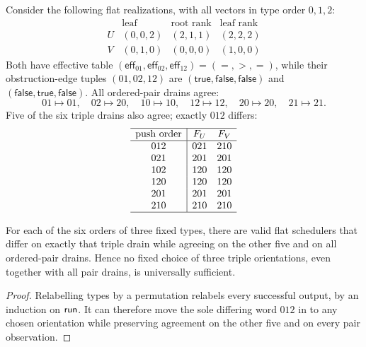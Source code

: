 \begin{example}
\label{ex:missing-orientation}
Consider the following flat realizations, with all vectors in type order
\(0,1,2\):
\begin{equation}
\begin{array}{c|ccc}
 & \text{leaf} & \text{root rank} & \text{leaf rank}\\
\hline
 U&(0,0,2)&(2,1,1)&(2,2,2)\\
 V&(0,1,0)&(0,0,0)&(1,0,0)
\end{array}
\label{eq:missing-orientation-pair}
\end{equation}
Both have effective table
\((\mathsf{eff}_{01},\mathsf{eff}_{02},\mathsf{eff}_{12})=(=,>,=)\), while
their obstruction-edge tuples \((01,02,12)\) are
\((\mathsf{true},\mathsf{false},\mathsf{false})\) and
\((\mathsf{false},\mathsf{true},\mathsf{false})\).  All ordered-pair drains
agree:
\begin{equation}
  01\mapsto01,\quad 02\mapsto20,\quad 10\mapsto10,\quad
  12\mapsto12,\quad 20\mapsto20,\quad 21\mapsto21.
  \label{eq:missing-orientation-pairs}
\end{equation}
Five of the six triple drains also agree; exactly \(012\) differs:
\begin{equation}
\begin{array}{c|cc}
\hline
\text{push order}&F_U&F_V\\
\hline
012&021&210\\
021&201&201\\
102&120&120\\
120&120&120\\
201&201&201\\
210&210&210\\
\hline
\end{array}
\label{eq:missing-orientation-drains}
\end{equation}
\end{example}

\begin{proposition}
\label{prop:no-three-orientations}
For each of the six orders of three fixed types, there are valid flat
schedulers that differ on exactly that triple drain while agreeing on the
other five and on all ordered-pair drains.  Hence no fixed choice of three
triple orientations, even together with all pair drains, is universally
sufficient.
\end{proposition}

\begin{proof}
Relabelling types by a permutation relabels every successful output, by an
induction on \(\mathsf{run}\).  It can therefore move the sole differing word \(012\)
in  to any chosen orientation while preserving
agreement on the other five and on every pair observation.
\end{proof}


